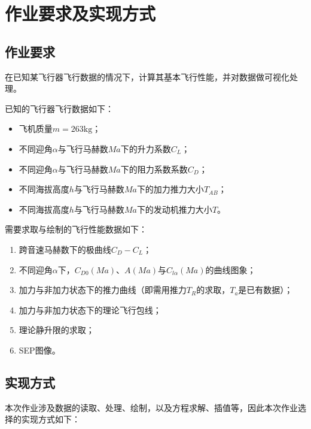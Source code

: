 \section{作业要求及实现方式}

\subsection{作业要求}

在已知某飞行器飞行数据的情况下，计算其基本飞行性能，并对数据做可视化处理。

已知的飞行器飞行数据如下：

\begin{itemize}
    \item 飞机质量$m=263\text{kg}$；
    \item 不同迎角$\alpha$与飞行马赫数$Ma$下的升力系数$C_L$；
    \item 不同迎角$\alpha$与飞行马赫数$Ma$下的阻力系数系数$C_D$；
    \item 不同海拔高度$h$与飞行马赫数$Ma$下的加力推力大小$T_{AB}$；
    \item 不同海拔高度$h$与飞行马赫数$Ma$下的发动机推力大小$T$。
\end{itemize}

需要求取与绘制的飞行性能数据如下：

\begin{enumerate}
    \item 跨音速马赫数下的极曲线$C_D-C_L$；
    \item 不同迎角$\alpha$下，$C_{D0}(Ma)$、$A(Ma)$与$C_{l\alpha}(Ma)$的曲线图象；
    \item 加力与非加力状态下的推力曲线（即需用推力$T_R$的求取，$T_a$是已有数据）；
    \item 加力与非加力状态下的理论飞行包线；
    \item 理论静升限的求取；
    \item SEP图像。
\end{enumerate}

\subsection{实现方式}

本次作业涉及数据的读取、处理、绘制，以及方程求解、插值等，因此本次作业选择的实现方式如下：

